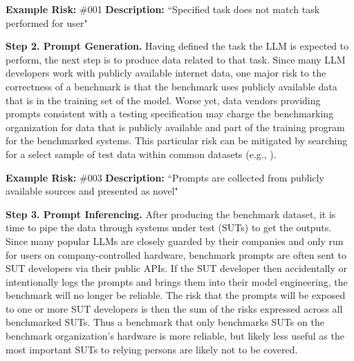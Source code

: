 \documentclass{article}
\begin{document}
\begin{center}
    \begin{tcolorbox}[colback=gray!10, colframe=black!50, width=\textwidth, boxrule=0.5mm, sharp corners, coltext=black]
        {\bf Example Risk:} \#001
        \newline
        {\bf Description:} ``Specified task does not match task performed for user"
    \end{tcolorbox}
\end{center}

{\bf Step 2. Prompt Generation.} Having defined the task the LLM is expected to perform, the next step is to produce data related to that task. Since many LLM developers work with publicly available internet data, one major risk to the correctness of a benchmark is that the benchmark uses publicly available data that is in the training set of the model. Worse yet, data vendors providing prompts consistent with a testing specification may charge the benchmarking organization for data that is publicly available and part of the training program for the benchmarked systems. This particular risk can be mitigated by searching for a select sample of test data within common datasets (e.g., \cite{commoncrawl}).

\begin{center}
    \begin{tcolorbox}[colback=gray!10, colframe=black!50, width=\textwidth, boxrule=0.5mm, sharp corners, coltext=black]
        {\bf Example Risk:} \#003
        \newline
        {\bf Description:} ``Prompts are collected from publicly available sources and presented as novel"
    \end{tcolorbox}
\end{center}

{\bf Step 3. Prompt Inferencing.} After producing the benchmark dataset, it is time to pipe the data through systems under test (SUTs) to get the outputs. Since many popular LLMs are closely guarded by their companies and only run for users on company-controlled hardware, benchmark prompts are often sent to SUT developers via their public APIs. If the SUT developer then accidentally or intentionally logs the prompts and brings them into their model engineering, the benchmark will no longer be reliable. The risk that the prompts will be exposed to one or more SUT developers is then the sum of the risks expressed across all benchmarked SUTs. Thus a benchmark that only benchmarks SUTs on the benchmark organization's hardware is more reliable, but likely less useful as the most important SUTs to relying persons are likely not to be covered.
\end{document}
